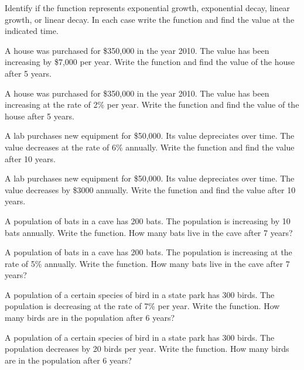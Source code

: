 Identify if the function represents exponential growth, exponential decay, linear growth, or linear decay. In each case write the function and find the value at the indicated time.

\begin{puzzle}

    A house was purchased for \$350,000 in the year 2010. The value has been increasing by \$7,000 per year. Write the function and find the value of the house after 5 years.
\end{puzzle}

\begin{puzzle} A house was purchased for \$350,000 in the year 2010. The value has been increasing at the rate of 2\% per year. Write the function and find the value of the house after 5 years.
\end{puzzle}

\begin{puzzle} A lab purchases new equipment for \$50,000. Its value depreciates over time. The value decreases at the rate of 6\% annually. Write the function and find the value after 10 years.
\end{puzzle}

\begin{puzzle} A lab purchases new equipment for \$50,000. Its value depreciates over time. The value decreases by \$3000 annually. Write the function and find the value after 10 years.
\end{puzzle}

\begin{puzzle} A population of bats in a cave has 200 bats. The population is increasing by 10 bats annually. Write the function. How many bats live in the cave after 7 years?
\end{puzzle}

\begin{puzzle} A population of bats in a cave has 200 bats. The population is increasing at the rate of 5\% annually. Write the function. How many bats live in the cave after 7 years?
\end{puzzle}

\begin{puzzle} A population of a certain species of bird in a state park has 300 birds. The population is decreasing at the rate of 7\% per year. Write the function. How many birds are in the population after 6 years?
\end{puzzle}

\begin{puzzle} A population of a certain species of bird in a state park has 300 birds. The population decreases by 20 birds per year. Write the function. How many birds are in the population after 6 years?
\end{puzzle}

